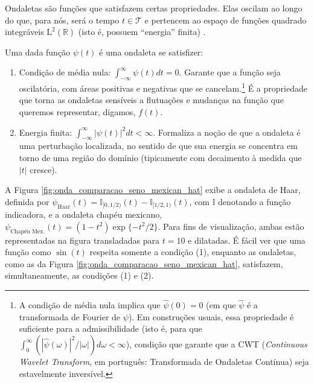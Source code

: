 Ondaletas são funções que satisfazem certas propriedades. Elas oscilam ao longo do que, para nós, será o tempo \(t \in \mathcal{T}\) e pertencem ao espaço de funções quadrado integráveis \(\mathrm{L}^{2}(\mathbb{R})\) (isto é, possuem ``energia'' finita) \cite{morettin_wavelets_2017, vidakovic_statistical_1999}.

Uma dada função \(\psi(t)\) é uma ondaleta se satisfizer:
\begin{enumerate}
  \item Condição de média nula: \(\int_{-\infty}^{\infty} \psi(t) dt = 0\). Garante que a função seja oscilatória, com áreas positivas e negativas que se cancelam.\footnote{A condição de média nula implica que \(\hat{\psi}(0) = 0\) (em que \(\hat{\psi}\) é a transformada de Fourier de \(\psi\)). Em construções usuais, essa propriedade é suficiente para a admissibilidade (isto é, para que \(\int_0^\infty \left(|\hat{\psi}(\omega)|^2/|\omega|\right) d\omega < \infty\)), condição que garante que a CWT (\emph{Continuous Wavelet Transform}, em português: Transformada de Ondaletas Contínua) seja estavelmente inversível.} É a propriedade que torna as ondaletas sensíveis a flutuações e mudanças na função que queremos representar, digamos, \(f(t)\).

  \item Energia finita: \(\int_{-\infty}^{\infty} |\psi(t)|^{2} dt < \infty\). Formaliza a noção de que a ondaleta é uma perturbação localizada, no sentido de que sua energia se concentra em torno de uma região do domínio (tipicamente com decaimento à medida que \(|t|\) cresce). 

\end{enumerate}

A Figura \ref{fig:onda_comparacao_seno_mexican_hat} exibe a ondaleta de Haar, definida por \(\psi_{\text{Haar}}(t) = \mathbb{I}_{[0, 1/2)}(t) - \mathbb{I}_{[1/2, 1)}(t)\), com \(\mathbb{I}\) denotando a função indicadora, e a ondaleta chapéu mexicano, \(\psi_{\text{Chapéu Mex.}}(t) = (1 - t^2) \exp\{-t^2/2\}\). Para fins de visualização, ambas estão representadas na figura transladadas para \(t=10\) e dilatadas. É fácil ver que uma função como \(\sin(t)\) respeita somente a condição (1), enquanto as ondaletas, como as da Figura \ref{fig:onda_comparacao_seno_mexican_hat}, satisfazem, simultaneamente, as condições (1) e (2).

